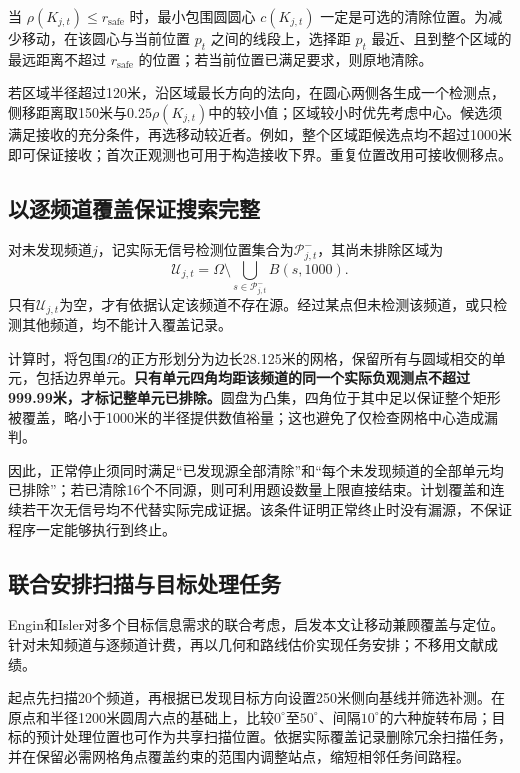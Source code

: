 当 \(\rho(K_{j,t})\le r_{\mathrm{safe}}\) 时，最小包围圆圆心 \(c(K_{j,t})\) 一定是可选的清除位置。为减少移动，在该圆心与当前位置 \(p_t\) 之间的线段上，选择距 \(p_t\) 最近、且到整个区域的最远距离不超过 \(r_{\mathrm{safe}}\) 的位置；若当前位置已满足要求，则原地清除。

若区域半径超过120米，沿区域最长方向的法向，在圆心两侧各生成一个检测点，侧移距离取150米与$0.25\rho(K_{j,t})$中的较小值；区域较小时优先考虑中心。候选须满足接收的充分条件，再选移动较近者。例如，整个区域距候选点均不超过1000米即可保证接收；首次正观测也可用于构造接收下界。重复位置改用可接收侧移点。

\subsection{以逐频道覆盖保证搜索完整}

对未发现频道$j$，记实际无信号检测位置集合为$\mathcal P^-_{j,t}$，其尚未排除区域为
\begin{equation}
\mathcal U_{j,t}=\Omega\setminus
 \bigcup_{s\in\mathcal P^-_{j,t}}B(s,1000).
\label{eq:q3-uncovered}
\end{equation}
只有$\mathcal U_{j,t}$为空，才有依据认定该频道不存在源。经过某点但未检测该频道，或只检测其他频道，均不能计入覆盖记录。

计算时，将包围$\Omega$的正方形划分为边长28.125米的网格，保留所有与圆域相交的单元，包括边界单元。\textbf{只有单元四角均距该频道的同一个实际负观测点不超过999.99米，才标记整单元已排除。}圆盘为凸集，四角位于其中足以保证整个矩形被覆盖，略小于1000米的半径提供数值裕量；这也避免了仅检查网格中心造成漏判。

因此，正常停止须同时满足“已发现源全部清除”和“每个未发现频道的全部单元均已排除”；若已清除16个不同源，则可利用题设数量上限直接结束。计划覆盖和连续若干次无信号均不代替实际完成证据。该条件证明正常终止时没有漏源，不保证程序一定能够执行到终止。

\subsection{联合安排扫描与目标处理任务}

Engin和Isler对多个目标信息需求的联合考虑\cite{Engin2020}，启发本文让移动兼顾覆盖与定位。针对未知频道与逐频道计费，再以几何和路线估价实现任务安排；不移用文献成绩。

起点先扫描20个频道，再根据已发现目标方向设置250米侧向基线并筛选补测。在原点和半径1200米圆周六点的基础上，比较$0^\circ$至$50^\circ$、间隔$10^\circ$的六种旋转布局；目标的预计处理位置也可作为共享扫描位置。依据实际覆盖记录删除冗余扫描任务，并在保留必需网格角点覆盖约束的范围内调整站点，缩短相邻任务间路程。


